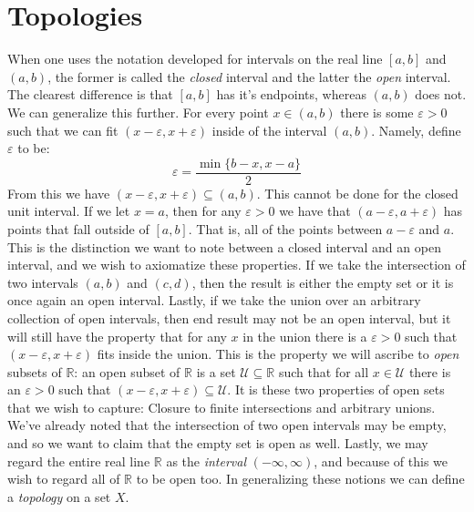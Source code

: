 \section{Topologies}
    When one uses the notation developed for intervals on the real line $[a,b]$
    and $(a,b)$, the former is called the \textit{closed} interval and the
    latter the \textit{open} interval. The clearest difference is that $[a,b]$
    has it's endpoints, whereas $(a,b)$ does not. We can generalize this
    further. For every point $x\in(a,b)$ there is some $\varepsilon>0$ such that
    we can fit $(x-\varepsilon,x+\varepsilon)$ inside of the interval $(a,b)$.
    Namely, define $\varepsilon$ to be:
    \begin{equation}
        \varepsilon=\frac{\min\{b-x,x-a\}}{2}
    \end{equation}
    From this we have $(x-\varepsilon,x+\varepsilon)\subseteq(a,b)$. This cannot
    be done for the closed unit interval. If we let $x=a$, then for any
    $\varepsilon>0$ we have that $(a-\varepsilon,a+\varepsilon)$ has points that
    fall outside of $[a,b]$. That is, all of the points between $a-\varepsilon$
    and $a$. This is the distinction we want to note between a closed interval
    and an open interval, and we wish to axiomatize these properties. If we take
    the intersection of two intervals $(a,b)$ and $(c,d)$, then the result is
    either the empty set or it is once again an open interval. Lastly, if we
    take the union over an arbitrary collection of open intervals, then end
    result may not be an open interval, but it will still have the property that
    for any $x$ in the union there is a $\varepsilon>0$ such that
    $(x-\varepsilon,x+\varepsilon)$ fits inside the union. This is the property
    we will ascribe to \textit{open} subsets of $\mathbb{R}$:
    an open subset of $\mathbb{R}$ is a set $\mathcal{U}\subseteq\mathbb{R}$
    such that for all $x\in\mathcal{U}$ there is an $\varepsilon>0$ such that
    $(x-\varepsilon,x+\varepsilon)\subseteq\mathcal{U}$. It is these two
    properties of open sets that we wish to capture: Closure to finite
    intersections and arbitrary unions. We've already noted that the
    intersection of two open intervals may be empty, and so we want to claim
    that the empty set is open as well. Lastly, we may regard the entire real
    line $\mathbb{R}$ as the \textit{interval} $(\minus\infty,\infty)$, and
    because of this we wish to regard all of $\mathbb{R}$ to be open too. In
    generalizing these notions we can define a \textit{topology} on a set $X$.
